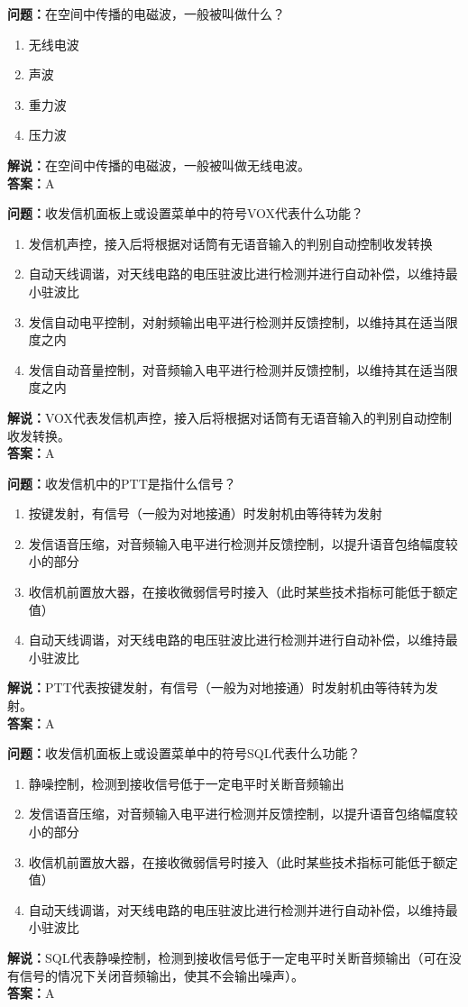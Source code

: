\documentclass[UTF8]{ctexbook}
\begin{document}
\textbf{问题：}在空间中传播的电磁波，一般被叫做什么？
\begin{enumerate}[label=\Alph*), leftmargin=3em]
  \item 无线电波
  \item 声波
  \item 重力波
  \item 压力波
\end{enumerate}
\textbf{解说：}在空间中传播的电磁波，一般被叫做无线电波。\\
\textbf{答案：}A

\textbf{问题：}收发信机面板上或设置菜单中的符号VOX代表什么功能？
\begin{enumerate}[label=\Alph*), leftmargin=3em]
  \item 发信机声控，接入后将根据对话筒有无语音输入的判别自动控制收发转换
  \item 自动天线调谐，对天线电路的电压驻波比进行检测并进行自动补偿，以维持最小驻波比
  \item 发信自动电平控制，对射频输出电平进行检测并反馈控制，以维持其在适当限度之内
  \item 发信自动音量控制，对音频输入电平进行检测并反馈控制，以维持其在适当限度之内
\end{enumerate}
\textbf{解说：}VOX代表发信机声控，接入后将根据对话筒有无语音输入的判别自动控制收发转换。\\
\textbf{答案：}A

\textbf{问题：}收发信机中的PTT是指什么信号？
\begin{enumerate}[label=\Alph*), leftmargin=3em]
  \item 按键发射，有信号（一般为对地接通）时发射机由等待转为发射
  \item 发信语音压缩，对音频输入电平进行检测并反馈控制，以提升语音包络幅度较小的部分
  \item 收信机前置放大器，在接收微弱信号时接入（此时某些技术指标可能低于额定值）
  \item 自动天线调谐，对天线电路的电压驻波比进行检测并进行自动补偿，以维持最小驻波比
\end{enumerate}
\textbf{解说：}PTT代表按键发射，有信号（一般为对地接通）时发射机由等待转为发射。\\
\textbf{答案：}A

\textbf{问题：}收发信机面板上或设置菜单中的符号SQL代表什么功能？
\begin{enumerate}[label=\Alph*), leftmargin=3em]
  \item 静噪控制，检测到接收信号低于一定电平时关断音频输出
  \item 发信语音压缩，对音频输入电平进行检测并反馈控制，以提升语音包络幅度较小的部分
  \item 收信机前置放大器，在接收微弱信号时接入（此时某些技术指标可能低于额定值）
  \item 自动天线调谐，对天线电路的电压驻波比进行检测并进行自动补偿，以维持最小驻波比
\end{enumerate}
\textbf{解说：}SQL代表静噪控制，检测到接收信号低于一定电平时关断音频输出（可在没有信号的情况下关闭音频输出，使其不会输出噪声）。\\
\textbf{答案：}A
\end{document}
